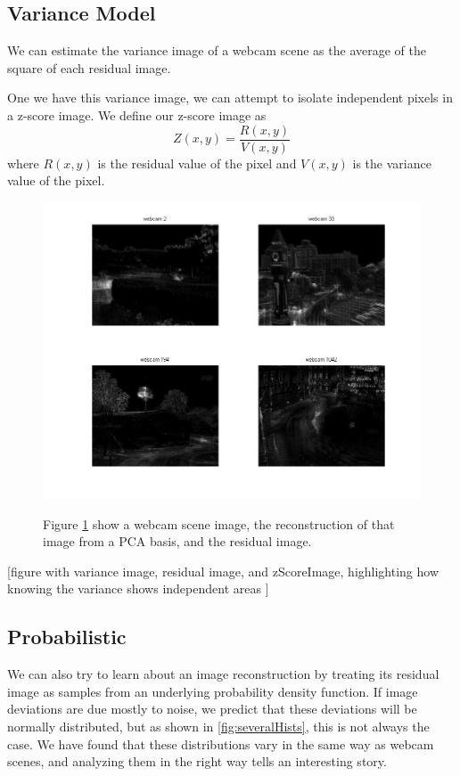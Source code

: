 \subsection{Variance Model}

We can estimate the variance image of a webcam scene as the average of the square of each residual image.

One we have this variance image, we can attempt to isolate independent pixels in a z-score image.  We define our z-score image as $$Z(x,y) = \frac{R(x,y)} { V(x,y)}$$ where $R(x,y)$ is the residual value of the pixel and $V(x,y)$ is the variance value of the pixel.

\begin{figure}
	\centering
		\includegraphics[width=1\textwidth]{figures/severalVarianceImages.jpg}
	\label{fig:servalVarianceImages}
	
		\caption[Residual SSD Montage.]{Figure \ref{fig:servalVarianceImages} show a webcam scene image, the reconstruction of that image from a PCA basis, and the residual image.}
\end{figure}

[figure with variance image, residual image, and zScoreImage, highlighting how knowing the variance shows independent areas ]

\subsection{Probabilistic}

We can also try to learn about an image reconstruction by treating its residual image as samples from an 
underlying probability density function.  If image deviations are due mostly to noise, we predict that these deviations will be normally distributed, but as shown in \ref{fig:severalHists}, this is not always the case.  We have found that these distributions vary in the same way as webcam scenes, and analyzing them in the right way tells an interesting story.

